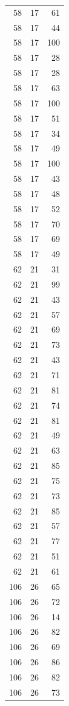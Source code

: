 \documentclass[
  letterpaper,
  DIV=11,
  numbers=noendperiod]{scrreprt}
\renewcommand{\[}{\begin{equation}}
\renewcommand{\]}{\end{equation}}
\begin{document}
\begin{table}
\begin{tabular*}{\linewidth}{@{\extracolsep{\fill}}rrr}
58 & 17 & 61 \\ 
58 & 17 & 44 \\ 
58 & 17 & 100 \\ 
58 & 17 & 28 \\ 
58 & 17 & 28 \\ 
58 & 17 & 63 \\ 
58 & 17 & 100 \\ 
58 & 17 & 51 \\ 
58 & 17 & 34 \\ 
58 & 17 & 49 \\ 
58 & 17 & 100 \\ 
58 & 17 & 43 \\ 
58 & 17 & 48 \\ 
58 & 17 & 52 \\ 
58 & 17 & 70 \\ 
58 & 17 & 69 \\ 
58 & 17 & 49 \\ 
62 & 21 & 31 \\ 
62 & 21 & 99 \\ 
62 & 21 & 43 \\ 
62 & 21 & 57 \\ 
62 & 21 & 69 \\ 
62 & 21 & 73 \\ 
62 & 21 & 43 \\ 
62 & 21 & 71 \\ 
62 & 21 & 81 \\ 
62 & 21 & 74 \\ 
62 & 21 & 81 \\ 
62 & 21 & 49 \\ 
62 & 21 & 63 \\ 
62 & 21 & 85 \\ 
62 & 21 & 75 \\ 
62 & 21 & 73 \\ 
62 & 21 & 85 \\ 
62 & 21 & 57 \\ 
62 & 21 & 77 \\ 
62 & 21 & 51 \\ 
62 & 21 & 61 \\ 
106 & 26 & 65 \\ 
106 & 26 & 72 \\ 
106 & 26 & 14 \\ 
106 & 26 & 82 \\ 
106 & 26 & 69 \\ 
106 & 26 & 86 \\ 
106 & 26 & 82 \\ 
106 & 26 & 73 \\ 

\end{tabular*}
\end{table}
\end{document}
